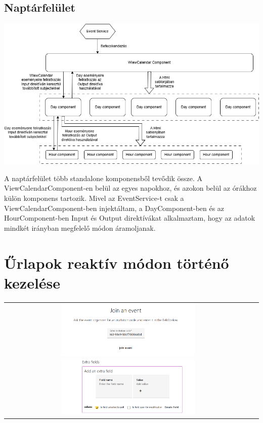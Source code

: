 \documentclass[a4paper,12pt]{report}
\theoremstyle{definition}
\theoremstyle{remark}
\begin{document}
	\subsection{Naptárfelület}

\begin{center}
\includegraphics[width=150mm]{view_calendar_structure}
\captionsetup{width=0.8\linewidth}
\end{center}

A naptárfelület több standalone komponensből tevődik össze. A ViewCalendarComponent-en belül az egyes napokhoz, és azokon belül az órákhoz külön komponens tartozik. Mivel az EventService-t csak a ViewCalendarComponent-ben injektáltam, a DayComponent-ben és az HourComponent-ben Input és Output direktívákat alkalmaztam, hogy az adatok mindkét irányban megfelelő módon áramoljanak.

\section{Űrlapok reaktív módon történő kezelése}

\begin{center}
\begin{tabular}{cc}
\includegraphics[width=70mm]{join_event}
\includegraphics[width=70mm]{extra_field_form}
\end{tabular}
\captionsetup{width=0.8\linewidth}
\end{center}
\end{document}
